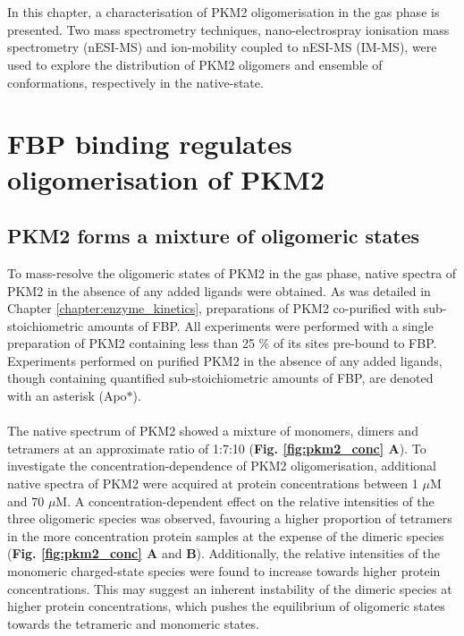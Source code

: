 %
%
\\\\
%
%
In this chapter, a characterisation of PKM2 oligomerisation in the gas phase is presented. Two mass spectrometry techniques, nano-electrospray ionisation mass spectrometry (nESI-MS) and ion-mobility coupled to nESI-MS (IM-MS), were used to explore the distribution of PKM2 oligomers and ensemble of conformations, respectively in the native-state. 

\clearpage

\section{FBP binding regulates oligomerisation of PKM2}

\subsection{PKM2 forms a mixture of oligomeric states}
\label{subsec:apo_pkm2_nms}
To mass-resolve the oligomeric states of PKM2 in the gas phase, native spectra of PKM2 in the absence of any added ligands were obtained. As was detailed in Chapter \ref{chapter:enzyme_kinetics}, preparations of PKM2 co-purified with sub-stoichiometric amounts of FBP. All experiments were performed with a single preparation of PKM2 containing less than 25 \% of its sites pre-bound to FBP. Experiments performed on purified PKM2 in the absence of any added ligands, though containing quantified sub-stoichiometric amounts of FBP, are denoted with an asterisk (Apo$\ast$).
%
%
\\\\
%
%
The native spectrum of PKM2 showed a mixture of monomers, dimers and tetramers at an approximate ratio of 1:7:10 (\textbf{Fig. \ref{fig:pkm2_conc} A}). To investigate the concentration-dependence of PKM2 oligomerisation, additional native spectra of PKM2 were acquired at protein concentrations between 1 $\mu$M and 70 $\mu$M. A concentration-dependent effect on the relative intensities of the three oligomeric species was observed, favouring a higher proportion of tetramers in the more concentration protein samples at the expense of the dimeric species (\textbf{Fig. \ref{fig:pkm2_conc} A} and \textbf{B}). Additionally, the relative intensities of the monomeric charged-state species were found to increase towards higher protein concentrations. This may suggest an inherent instability of the dimeric species at higher protein concentrations, which pushes the equilibrium of oligomeric states towards the tetrameric and monomeric states.
